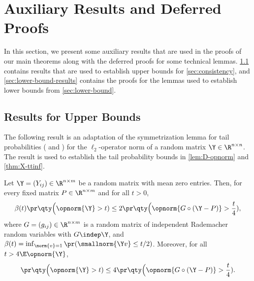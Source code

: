 \documentclass[10pt]{article}
\begin{document}

\section{Auxiliary Results and Deferred Proofs}\label{sec:auxiliary}

In this section, we present some auxiliary results that are used in the proofs of our main theorems along with the deferred proofs for some technical lemmas. \cref{sec:upper-bound-results} contains results that are used to establish upper bounds for \cref{sec:consistency}, and \cref{sec:lower-bound-results} contains the proofs for the lemmas used to establish lower bounds from \cref{sec:lower-bound}.

\subsection{Results for Upper Bounds}
\label{sec:upper-bound-results}

The following result is an adaptation of the symmetrization lemma for tail probabilities (\citealp[Lemma~2.3.7~of][]{van2023weak} and \citealp[Proposition~3.1.24~of][]{gine2016mathematical}) for the $\ell_{2}$-operator norm of a random matrix $\Y \in \R^{n \times n}$. The result is used to establish the tail probability bounds in \cref{lem:D-opnorm} and \cref{thm:X-ttinf}.

\begin{lemma}\label{lem:opnorm-symmetrization}
    Let $\Y = (Y_{ij}) \in \R^{n \times m}$ be a random matrix with mean zero entries. Then, for every fixed matrix $P \in \R^{n \times m}$ and for all $t> 0$,
    \begin{align}
        \beta(t) \pr\qty\Big( \opnorm{\Y} > t ) \le 2 \pr\qty\Big( \opnorm{G \circ (\Y - P)} > \frac{t}{4} ),\label{eq:opnorm-symmetrization}
    \end{align}
    where $G = (g_{ij}) \in \R^{n \times m}$ is a random matrix of independent Rademacher random variables with $G \indep \Y$, and $\beta(t) = \inf_{\norm{v}=1}{\pr( \smallnorm{\Y v} \le t/2 )}$. Moreover, for all $t > 4 \E\opnorm{\Y}$,
    \begin{align}
        \pr\qty\Big( \opnorm{\Y} > t ) \le 4 \pr\qty\Big( \opnorm{G \circ (\Y - P)} > \frac{t}{4} ).\label{eq:opnorm-symmetrization-markov}
    \end{align}
\end{lemma}
\end{document}
